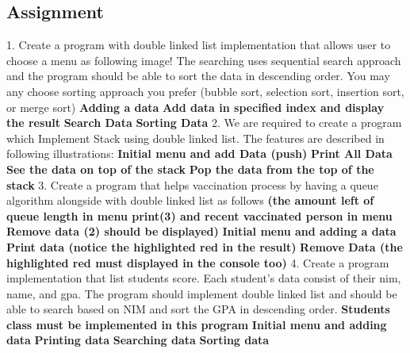\documentclass[12pt,titlepage]{article}
\begin{document}
\subsection{Assignment}
1. Create a program with double linked list implementation that allows user to choose a menu as following image! The searching uses sequential search approach and the program should be able to sort the data in descending order. You may any choose sorting approach you prefer (bubble sort, selection sort, insertion sort, or merge sort)
\textbf{Adding a data}
\textbf{Add data in specified index and display the result}
\textbf{Search Data}
\textbf{Sorting Data}
2. We are required to create a program which Implement Stack using double linked list. The features are described in following illustrations:
\textbf{Initial menu and add Data (push)}
\textbf{Print All Data}
\textbf{See the data on top of the stack}
\textbf{Pop the data from the top of the stack}
3. Create a program that helps vaccination process by having a queue algorithm alongside with double linked list as follows \textbf{(the amount left of queue length in menu print(3) and recent vaccinated person in menu Remove data (2) should be displayed)}
\textbf{Initial menu and adding a data}
\textbf{Print data (notice the highlighted red in the result)}
\textbf{Remove Data (the highlighted red must displayed in the console too)}
4. Create a program implementation that list students score. Each student’s data consist of their nim, name, and gpa. The program should implement double linked list and should be able to search based on NIM and sort the GPA in descending order. \textbf{Students class must be implemented in this program}
\textbf{Initial menu and adding data}
\textbf{Printing data}
\textbf{Searching data}
\textbf{Sorting data}
\end{document}
